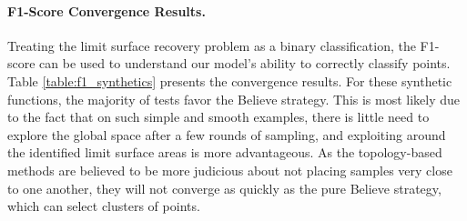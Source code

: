 
\paragraph{F1-Score Convergence Results.}
Treating the limit surface recovery problem as a binary classification, the F1-score can be used to understand our model's ability to correctly classify points.
%
Table \ref{table:f1_synthetics} presents the convergence results.
For these synthetic functions, the majority of tests favor the Believe strategy.
%
This is most likely due to the fact that on such simple and smooth examples, there is little need to explore the global space after a few rounds of sampling, and exploiting around the identified limit surface areas is more advantageous.
%
As the topology-based methods are believed to be more judicious about not placing samples very close to one another, they will not converge as quickly as the pure Believe strategy, which can select clusters of points.

